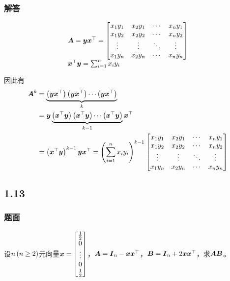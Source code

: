 \documentclass{beamer}
\begin{document}
\begin{frame}[allowframebreaks]
\frametitle{解答}

    \begin{equation*}
        \begin{array}{lll}
            \boldsymbol{A}=\boldsymbol{y}\boldsymbol{x}^\top=
            \begin{bmatrix}
                x_1y_1 & x_2y_1 & \cdots & x_ny_1 \\
                x_1y_2 & x_2y_2 & \cdots & x_ny_2 \\
                \vdots & \vdots & \ddots & \vdots \\
                x_1y_n & x_2y_n & \cdots & x_ny_n \\
            \end{bmatrix}         \\
            \boldsymbol{x}^\top\boldsymbol{y}=\sum_{i=1}^nx_iy_i \\
        \end{array}
    \end{equation*}

    因此有
    \begin{align*}
        \boldsymbol{A}^k & =\underbrace{\left( \boldsymbol{y}\boldsymbol{x}^\top \right)\left( \boldsymbol{y}\boldsymbol{x}^\top \right)\cdots\left( \boldsymbol{y}\boldsymbol{x}^\top \right)}_k                    \\
                & =\boldsymbol{y}\underbrace{\left( \boldsymbol{x}^\top\boldsymbol{y} \right)\left( \boldsymbol{x}^\top\boldsymbol{y} \right)\cdots\left( \boldsymbol{x}^\top\boldsymbol{y} \right)}_{k-1}\boldsymbol{x}^\top \\
                & =\left( \boldsymbol{x}^\top\boldsymbol{y} \right)^{k-1}\boldsymbol{y}\boldsymbol{x}^\top=\left( \sum_{i=1}^nx_iy_i \right)^{k-1}
        \begin{bmatrix}
            x_1y_1 & x_2y_1 & \cdots & x_ny_1 \\
            x_1y_2 & x_2y_2 & \cdots & x_ny_2 \\
            \vdots & \vdots & \ddots & \vdots \\
            x_1y_n & x_2y_n & \cdots & x_ny_n \\
        \end{bmatrix}
    \end{align*}

\end{frame}

\subsection*{1.13}

\begin{frame}
\frametitle{题面}

设\(n\left( n\ge2 \right)\)元向量\(\boldsymbol{x}=\begin{bmatrix}\frac12\\0\\\vdots\\0\\\frac12\end{bmatrix}\)，\(\boldsymbol{A}=\boldsymbol{I}_n-\boldsymbol{x}\boldsymbol{x}^\top\)，\(\boldsymbol{B}=\boldsymbol{I}_n+2\boldsymbol{x}\boldsymbol{x}^\top\)，求\(\boldsymbol{A}\boldsymbol{B}\)。

\end{frame}
\end{document}
